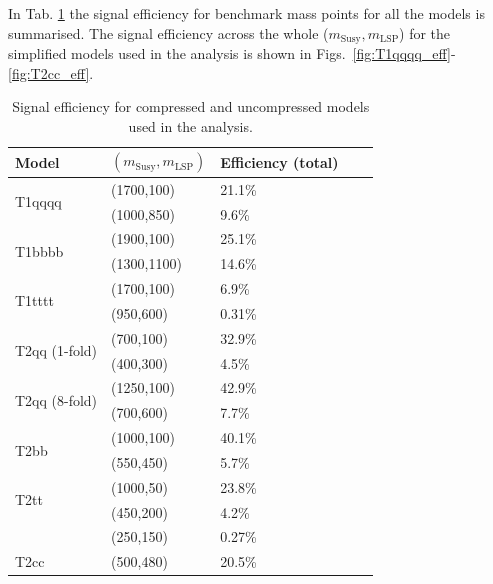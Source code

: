 In Tab. \ref{tab:sig-eff} the signal efficiency for benchmark mass
points for all the models is summarised. The signal efficiency across
the whole ($m_{\mathrm{Susy}},m_{\mathrm{LSP}}$) for the simplified
models used in the analysis is shown in
Figs.~\ref{fig:T1qqqq_eff}-\ref{fig:T2cc_eff}.

\begin{table}[h!]
    \scriptsize
    \caption{Signal efficiency for compressed and uncompressed models used in
        the analysis.}
    \label{tab:sig-eff}
    \centering
    \begin{tabular}{ lllll }
        \hline \hline
        Model & $(m_{\mathrm{Susy}},m_{\mathrm{LSP}})$ & Efficiency (total) \\ 
        \hline
        \multirow{2}{*}{T1qqqq}
            & (1700,100) & 21.1\% \\
            & (1000,850) & 9.6\% \\
        \hline
        \multirow{2}{*}{T1bbbb}
            & (1900,100)  & 25.1\% \\
            & (1300,1100) & 14.6\% \\
        \hline
        \multirow{2}{*}{T1tttt}
            & (1700,100) & 6.9\% \\
            & (950,600)  & 0.31\% \\
        \hline
        \multirow{2}{*}{T2qq (1-fold)}
            & (700,100) & 32.9\% \\
            & (400,300) & 4.5\% \\
        \hline
        \multirow{2}{*}{T2qq (8-fold)}
            & (1250,100) & 42.9\% \\
            & (700,600)  & 7.7\% \\
        \hline
        \multirow{2}{*}{T2bb}
            & (1000,100) & 40.1\% \\
            & (550,450)  & 5.7\% \\
        \hline
        \multirow{2}{*}{T2tt}
            & (1000,50) & 23.8\% \\
            & (450,200) & 4.2\% \\
            & (250,150) & 0.27\% \\
        \hline
        T2cc
            & (500,480) & 20.5\% \\
        \hline \hline
    \end{tabular}
\end{table}

